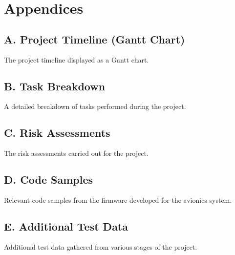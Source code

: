 \section{Appendices}
\subsection{A. Project Timeline (Gantt Chart)}
The project timeline displayed as a Gantt chart.

\subsection{B. Task Breakdown}
A detailed breakdown of tasks performed during the project.

\subsection{C. Risk Assessments}
The risk assessments carried out for the project.

\subsection{D. Code Samples}
Relevant code samples from the firmware developed for the avionics system.

\subsection{E. Additional Test Data}
Additional test data gathered from various stages of the project.

